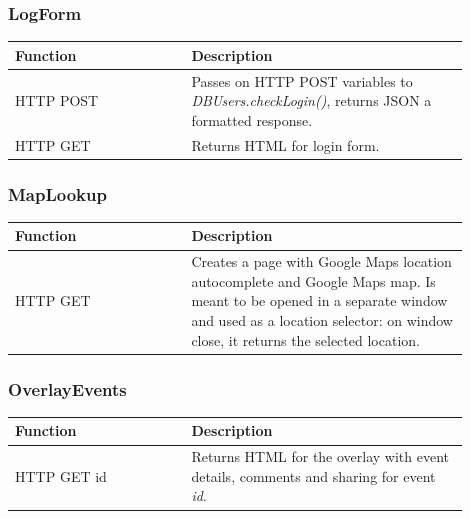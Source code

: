\subsubsection{LogForm}
\begin{minipage}{\linewidth}
  \centering
  \setlength{\tabcolsep}{12pt}
  \begin{tabular}{|p{0.35\linewidth}|p{0.55\linewidth}|}
  \hline
  \cellcolor{gray!25} Function & \cellcolor{gray!25} Description \\
  \hline
  HTTP POST & Passes on HTTP POST variables to \textit{DBUsers.checkLogin()}, returns JSON a formatted response. \\
  HTTP GET & Returns HTML for login form. \\
  \hline
  \end{tabular}
\end{minipage}

\subsubsection{MapLookup}
\begin{minipage}{\linewidth}
  \centering
  \setlength{\tabcolsep}{12pt}
  \begin{tabular}{|p{0.35\linewidth}|p{0.55\linewidth}|}
  \hline
  \cellcolor{gray!25} Function & \cellcolor{gray!25} Description \\
  \hline
  HTTP GET & Creates a page with Google Maps location autocomplete and Google Maps map. Is meant to be opened in a separate window and used as a location selector: on window close, it returns the selected location. \\
  \hline
  \end{tabular}
\end{minipage}

\subsubsection{OverlayEvents}
\begin{minipage}{\linewidth}
  \centering
  \setlength{\tabcolsep}{12pt}
  \begin{tabular}{|p{0.35\linewidth}|p{0.55\linewidth}|}
  \hline
  \cellcolor{gray!25} Function & \cellcolor{gray!25} Description \\
  \hline
  HTTP GET id & Returns HTML for the overlay with event details, comments and sharing for event \textit{id}. \\
  \hline
  \end{tabular}
\end{minipage}

